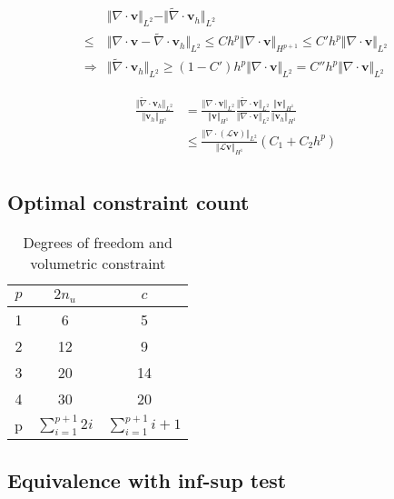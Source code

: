 \begin{equation}
\begin{split}
    &\Vert \nabla \cdot \boldsymbol v \Vert_{L^2} - \Vert \tilde \nabla \cdot \boldsymbol v_h \Vert_{L^2} \\ 
    \le& \Vert \nabla \cdot \boldsymbol v - \tilde \nabla \cdot \boldsymbol v_h \Vert_{L^2}
    \le Ch^{p} \Vert \nabla \cdot \boldsymbol v \Vert_{H^{p+1}} 
    \le C' h^p \Vert \nabla \cdot \boldsymbol v \Vert_{L^2} \\
    \Rightarrow& \Vert \tilde \nabla \cdot \boldsymbol v_h \Vert_{L^2} \ge (1-C') h^p \Vert \nabla \cdot \boldsymbol v \Vert_{L^2} = C'' h^p \Vert \nabla \cdot \boldsymbol v \Vert_{L^2}
\end{split}
\end{equation}

\begin{equation}
\begin{split}
    \frac{\Vert \tilde \nabla \cdot \boldsymbol v_h \Vert_{L^2}}{\Vert \boldsymbol v_h \Vert_{H^1}} &=
    \frac{\Vert \nabla \cdot \boldsymbol v \Vert_{L^2}}{\Vert \boldsymbol v \Vert_{H^1}}
    \frac{\Vert \tilde \nabla \cdot \boldsymbol v \Vert_{L^2}}{\Vert \nabla \cdot \boldsymbol v \Vert_{L^2}}
    \frac{\Vert \boldsymbol v \Vert_{H^1}}{\Vert \boldsymbol v_h \Vert_{H^1}} \\
    & \le
    \frac{\Vert \nabla \cdot (\mathcal L \boldsymbol v) \Vert_{L^2}}{\Vert \mathcal L \boldsymbol v \Vert_{H^1}}
    (C_1 + C_2 h^{p}) \\
\end{split}
\end{equation}
\subsection{Optimal constraint count}
\begin{table}[ht!]
\centering
\caption{Degrees of freedom and volumetric constraint}
\begin{tabular}{ccc}
\toprule
$p$ & $2n_u$ & $c$ \\
\midrule
1 & 6 & 5 \\
2 & 12 & 9 \\
3 & 20 & 14 \\
4 & 30 & 20 \\
p & $\sum_{i=1}^{p+1}2i$ & $\sum_{i=1}^{p+1}i+1$ \\
\bottomrule
\end{tabular}
\end{table}
\subsection{Equivalence with inf-sup test}
